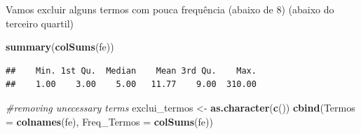 \documentclass[]{article}
\newenvironment{Shaded}{\begin{snugshade}}{\end{snugshade}}
\newcommand{\CommentTok}[1]{\textcolor[rgb]{0.56,0.35,0.01}{\textit{#1}}}
\newcommand{\DataTypeTok}[1]{\textcolor[rgb]{0.13,0.29,0.53}{#1}}
\newcommand{\DecValTok}[1]{\textcolor[rgb]{0.00,0.00,0.81}{#1}}
\newcommand{\KeywordTok}[1]{\textcolor[rgb]{0.13,0.29,0.53}{\textbf{#1}}}
\newcommand{\NormalTok}[1]{#1}
\newcommand{\OperatorTok}[1]{\textcolor[rgb]{0.81,0.36,0.00}{\textbf{#1}}}
\newcommand{\OtherTok}[1]{\textcolor[rgb]{0.56,0.35,0.01}{#1}}
\newcommand{\StringTok}[1]{\textcolor[rgb]{0.31,0.60,0.02}{#1}}
\begin{document}
\begin{Shaded}
\end{Shaded}

Vamos excluir alguns termos com pouca frequência (abaixo de 8) (abaixo
do terceiro quartil)

\begin{Shaded}
\begin{Highlighting}[]
\KeywordTok{summary}\NormalTok{(}\KeywordTok{colSums}\NormalTok{(fe))}
\end{Highlighting}
\end{Shaded}

\begin{verbatim}
##    Min. 1st Qu.  Median    Mean 3rd Qu.    Max. 
##    1.00    3.00    5.00   11.77    9.00  310.00
\end{verbatim}

\begin{Shaded}
\begin{Highlighting}[]
 \CommentTok{#removing unecessary terms}
\NormalTok{    exclui_termos <-}\StringTok{ }\KeywordTok{as.character}\NormalTok{(}\KeywordTok{c}\NormalTok{())}
     \KeywordTok{cbind}\NormalTok{(}\DataTypeTok{Termos =} \KeywordTok{colnames}\NormalTok{(fe), }\DataTypeTok{Freq_Termos =} \KeywordTok{colSums}\NormalTok{(fe))}
\end{Highlighting}
\end{Shaded}
\end{document}
